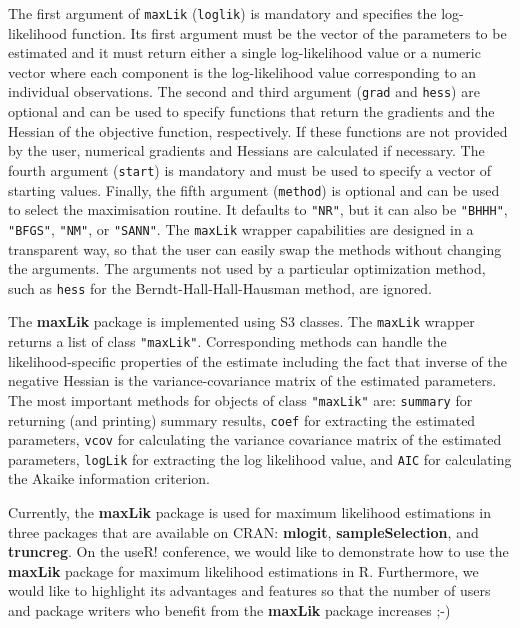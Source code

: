 \documentclass[10pt]{article}
\newcommand{\code}[1]{\texttt{#1}}
\begin{document}
The first argument of \code{maxLik} (\code{loglik})
is mandatory and specifies the log-likelihood function.
Its first argument must be the vector of the parameters to be estimated
and it must return either a single log-likelihood value or
a numeric vector where each component is the log-likelihood value
corresponding to an individual observations.
The second and third argument (\code{grad} and \code{hess})
are optional and can be used to specify functions
that return the gradients and the Hessian of the objective function,
respectively.
If these functions are not provided by the user,
numerical gradients and Hessians are calculated if necessary.
The fourth argument (\code{start}) is mandatory and
must be used to specify a vector of starting values.
Finally, the fifth argument (\code{method}) is optional and
can be used to select the maximisation routine.
It defaults to \code{"NR"}, but it can also be \code{"BHHH"},
\code{"BFGS"}, \code{"NM"}, or \code{"SANN"}.  The \code{maxLik}
wrapper capabilities are designed in a transparent way, so that the
user can easily swap the methods without changing the
arguments.  The arguments not used by a particular optimization
method, such as \code{hess} for the Berndt-Hall-Hall-Hausman method,
are ignored.

The \textbf{maxLik} package is implemented using S3 classes.
The \code{maxLik} wrapper returns a list of class \code{"maxLik"}.
Corresponding methods can handle the likelihood-specific properties
of the estimate including the fact
that inverse of the negative Hessian is the variance-covariance matrix
of the estimated parameters.
The most important methods for objects of class \code{"maxLik"} are:
\code{summary} for returning (and printing) summary results,
\code{coef} for extracting the estimated parameters,
\code{vcov} for calculating the variance covariance matrix
of the estimated parameters,
\code{logLik} for extracting the log likelihood value, and
\code{AIC} for calculating the Akaike information criterion.

Currently, the \textbf{maxLik} package is used for maximum likelihood
estimations in three packages that are available on CRAN:
\textbf{mlogit}, \textbf{sampleSelection},
and \textbf{truncreg}.
On the useR! conference,
we would like to demonstrate how to use the \textbf{maxLik} package
for maximum likelihood estimations in \textsf{R}.
Furthermore, we would like to highlight its advantages and features
so that the number of users and package writers
who benefit from the \textbf{maxLik} package increases ;-)

%
%
\end{document}
